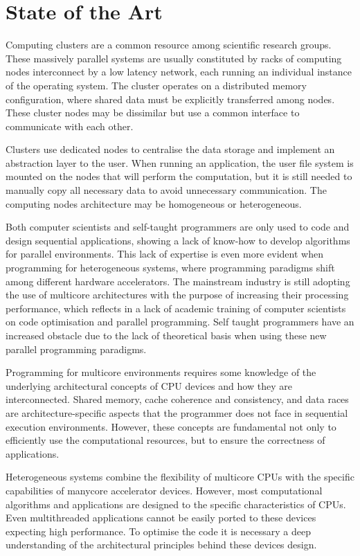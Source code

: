 
\chapter{State of the Art}
\label{state_of_the_art}

Computing clusters are a common resource among scientific research groups. These massively parallel systems are usually constituted by racks of computing nodes interconnect by a low latency network, each running an individual instance of the operating system. The cluster operates on a distributed memory configuration, where shared data must be explicitly transferred among nodes. These cluster nodes may be dissimilar but use a common interface to communicate with each other.

Clusters use dedicated nodes to centralise the data storage and implement an abstraction layer to the user. When running an application, the user file system is mounted on the nodes that will perform the computation, but it is still needed to manually copy all necessary data to avoid unnecessary communication. The computing nodes architecture may be homogeneous or heterogeneous.

Both computer scientists and self-taught programmers are only used to code and design sequential applications, showing a lack of know-how to develop algorithms for parallel environments. This lack of expertise is even more evident when programming for heterogeneous systems, where programming paradigms shift among different hardware accelerators. The mainstream industry is still adopting the use of multicore architectures with the purpose of increasing their processing performance, which reflects in a lack of academic training of computer scientists on code optimisation and parallel programming. Self taught programmers have an increased obstacle due to the lack of theoretical basis when using these new parallel programming paradigms.

Programming for multicore environments requires some knowledge of the underlying architectural concepts of CPU devices and how they are interconnected. Shared memory, cache coherence and consistency, and data races are architecture-specific aspects that the programmer does not face in sequential execution environments. However, these concepts are fundamental not only to efficiently use the computational resources, but to ensure the correctness of applications.

Heterogeneous systems combine the flexibility of multicore CPUs with the specific capabilities of manycore accelerator devices. However, most computational algorithms and applications are designed to the specific characteristics of CPUs. Even multithreaded applications cannot be easily ported to these devices expecting high performance. To optimise the code it is necessary a deep understanding of the architectural principles behind these devices design.

